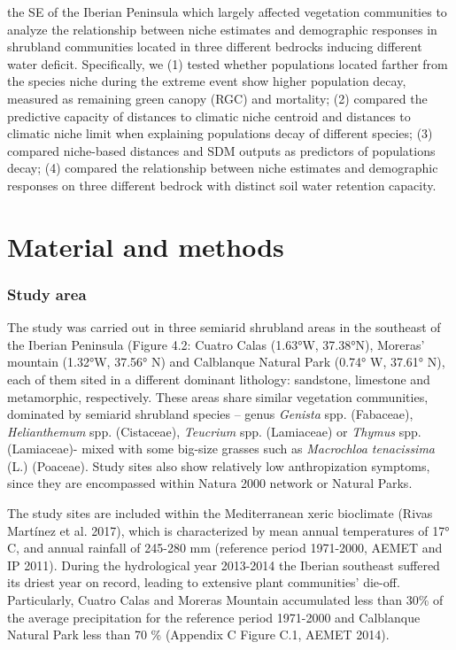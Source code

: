 \documentclass[11pt,twoside]{reedthesis}
\begin{document}
the SE of the Iberian Peninsula which largely affected vegetation
communities to analyze the relationship between niche estimates and
demographic responses in shrubland communities located in three
different bedrocks inducing different water deficit. Specifically, we
(1) tested whether populations located farther from the species niche
during the extreme event show higher population decay, measured as
remaining green canopy (RGC) and mortality; (2) compared the predictive
capacity of distances to climatic niche centroid and distances to
climatic niche limit when explaining populations decay of different
species; (3) compared niche-based distances and SDM outputs as
predictors of populations decay; (4) compared the relationship between
niche estimates and demographic responses on three different bedrock
with distinct soil water retention capacity.\par

\section{Material and methods}\label{material-and-methods-2}

\subsubsection{Study area}\label{study-area-1}

The study was carried out in three semiarid shrubland areas in the
southeast of the Iberian Peninsula (Figure 4.2: Cuatro Calas (1.63°W,
37.38°N), Moreras' mountain (1.32°W, 37.56° N) and Calblanque Natural
Park (0.74° W, 37.61° N), each of them sited in a different dominant
lithology: sandstone, limestone and metamorphic, respectively. These
areas share similar vegetation communities, dominated by semiarid
shrubland species -- genus \emph{Genista} spp. (Fabaceae),
\emph{Helianthemum} spp. (Cistaceae), \emph{Teucrium} spp. (Lamiaceae)
or \emph{Thymus} spp. (Lamiaceae)- mixed with some big-size grasses such
as \emph{Macrochloa tenacissima} (L.) (Poaceae). Study sites also show
relatively low anthropization symptoms, since they are encompassed
within Natura 2000 network or Natural Parks.\par

The study sites are included within the Mediterranean xeric bioclimate
(Rivas Martínez et al. 2017), which is characterized by mean annual
temperatures of 17° C, and annual rainfall of 245-280 mm (reference
period 1971-2000, AEMET and IP 2011). During the hydrological year
2013-2014 the Iberian southeast suffered its driest year on record,
leading to extensive plant communities' die-off. Particularly, Cuatro
Calas and Moreras Mountain accumulated less than 30\% of the average
precipitation for the reference period 1971-2000 and Calblanque Natural
Park less than 70 \% (Appendix C Figure C.1, AEMET 2014).\par
\end{document}
